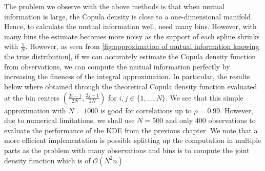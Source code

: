\documentclass[../Thesis.tex]{subfiles}
\begin{document}
The problem we observe with the above methods is that when mutual information is large, the Copula density is close to a one-dimensional manifold. Hence, to calculate the mutual information well, need many bins. However, with many bins the estimate becomes more noisy as the support of each spline shrinks with $\frac{1}{N}$. However, as seen from \autoref{fig:approximation of mutual information knowing the true distribution}, if we can accurately estimate the Copula density function from observations, we can compute the mutual information perfectly by increasing the fineness of the integral approximation. In particular, the results below where obtained through the theoretical Copula density function evaluated at the bin centers $\left(\frac{2i - 1}{2N}, \frac{2j - 1}{2N}\right)$ for $i,j \in \{1,\dots, N\}$. We see that this simple approximation with $N = 1000$ is good for correlations up to $\rho = 0.99$. However, due to numerical limitations, we shall use $N = 500$ and only $400$ observations to evaluate the performance of the KDE from the previous chapter. We note that a more efficient implementation is possible splitting up the computation in multiple parts as the problem with many observations and bins is to compute the joint density function which is of $\mathcal{O}\left(N^2n\right)$
\end{document}
